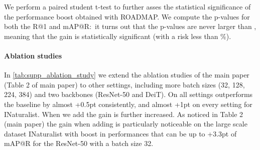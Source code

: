 We perform a paired student t-test to further asses the statistical significance of the performance boost obtained with ROADMAP. We compute the p-values for both the R@1 and mAP@R:~it turns out that the p-values are never larger than , meaning that the gain is statistically significant (with a risk less than \%).


\paragraph*{Ablation studies}

In \cref{tab:supp_ablation_study} we extend the ablation studies of the main paper (Table 2 of main paper) to other settings, including more batch sizes (32, 128, 224, 384) and two backbones (ResNet-50 and DeiT).
On all settings  outperforms the  baseline by almost +0.5pt consistently, and almost +1pt on every setting for INaturalist. When we add  the gain is further increased. As noticed in Table 2 (main paper) the gain when adding  is particularly noticeable on the large scale dataset INaturalist with boost in performances that can be up to +3.3pt of mAP@R for the ResNet-50 with a batch size 32.



